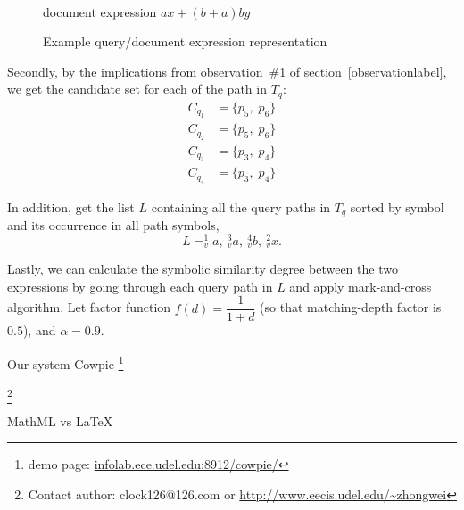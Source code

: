 \begin{figure}
\begin{minipage}[b]{2.65in}
\begin{center}
{
} 
\\[5mm]
document expression $ax + (b+a)by$
\end{center}
\end{minipage}
\caption{Example query/document expression representation}\label{expGraph}
\end{figure}

Secondly, by the implications from observation~\#1 of section~\ref{observationlabel}, we get the candidate set for each of the path in $T_q$:
$$
\begin{aligned}
C_{q_1} &= \{ p_5,\; p_6 \} \\
C_{q_2} &= \{ p_5,\; p_6 \} \\
C_{q_3} &= \{ p_3,\; p_4 \} \\
C_{q_4} &= \{ p_3,\; p_4 \} 
\end{aligned}
$$

In addition, get the list $L$ containing all the query paths in $T_q$ sorted by symbol and its occurrence in all path symbols, 
$$
L = ^1_v a,\ ^3_v a,\ ^4_v b,\ ^2_vx.
$$

Lastly, we can calculate the symbolic similarity degree between the two expressions by going through each query path in $L$ and apply mark-and-cross algorithm. 
Let factor function $f(d) = \dfrac{1}{1 + d}$ (so that matching-depth factor is $0.5$), and $\alpha = 0.9$.

Our system Cowpie \footnote{demo page: \url{infolab.ece.udel.edu:8912/cowpie/}}

\let\thefootnote\relax\footnote{Contact author: clock126@126.com or
\url{http://www.eecis.udel.edu/~zhongwei}}

MathML vs LaTeX
